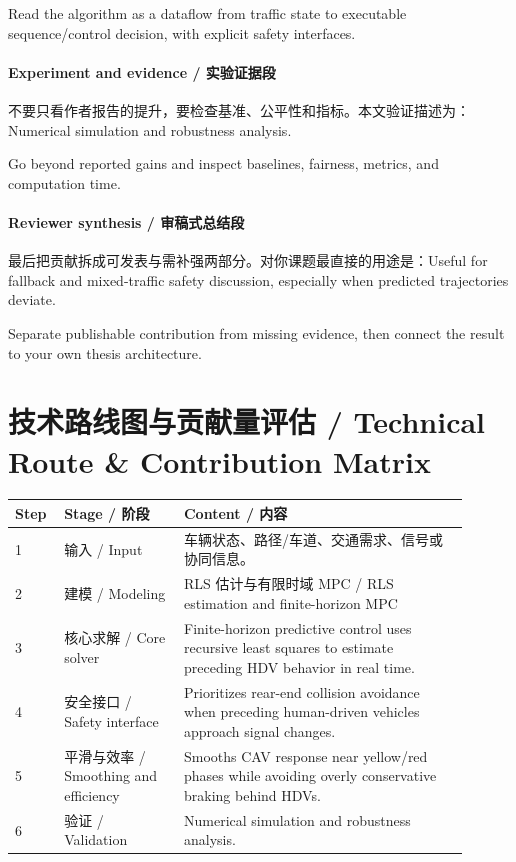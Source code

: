 \documentclass[UTF8,a4paper,11pt,fontset=fandol]{ctexart}
\begin{document}
Read the algorithm as a dataflow from traffic state to executable sequence/control decision, with explicit safety interfaces.

\paragraph{Experiment and evidence / 实验证据段}不要只看作者报告的提升，要检查基准、公平性和指标。本文验证描述为：Numerical simulation and robustness analysis.

Go beyond reported gains and inspect baselines, fairness, metrics, and computation time.

\paragraph{Reviewer synthesis / 审稿式总结段}最后把贡献拆成可发表与需补强两部分。对你课题最直接的用途是：Useful for fallback and mixed-traffic safety discussion, especially when predicted trajectories deviate.

Separate publishable contribution from missing evidence, then connect the result to your own thesis architecture.


\section{技术路线图与贡献量评估 / Technical Route \& Contribution Matrix}
\begin{longtable}{p{0.08\linewidth}p{0.24\linewidth}p{0.58\linewidth}}
\toprule
Step & Stage / 阶段 & Content / 内容\\
\midrule
1 & 输入 / Input & 车辆状态、路径/车道、交通需求、信号或协同信息。 \\
2 & 建模 / Modeling & RLS 估计与有限时域 MPC / RLS estimation and finite-horizon MPC \\
3 & 核心求解 / Core solver & Finite-horizon predictive control uses recursive least squares to estimate preceding HDV behavior in real time. \\
4 & 安全接口 / Safety interface & Prioritizes rear-end collision avoidance when preceding human-driven vehicles approach signal changes. \\
5 & 平滑与效率 / Smoothing and efficiency & Smooths CAV response near yellow/red phases while avoiding overly conservative braking behind HDVs. \\
6 & 验证 / Validation & Numerical simulation and robustness analysis. \\
\bottomrule
\end{longtable}
\end{document}
